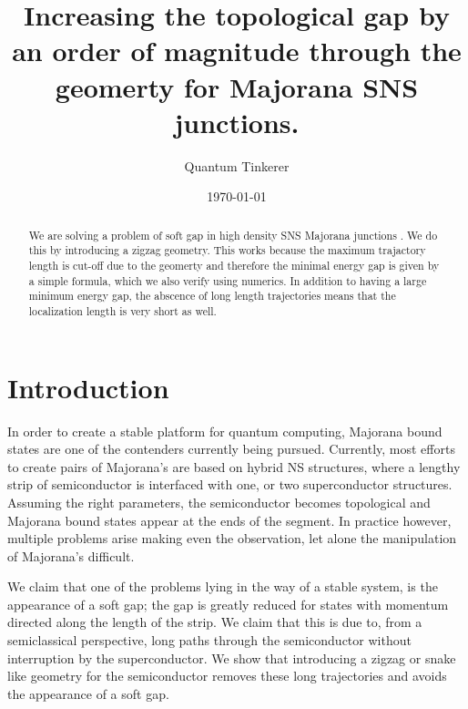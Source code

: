 \documentclass[english, twocolumn, 10pt, aps, superscriptaddress, floatfix, prb, citeautoscript]{revtex4-1}
\begin{document}
\title{Increasing the topological gap by an order of magnitude through the geomerty for Majorana SNS junctions.}

\author{Quantum Tinkerer}

\date{\today}

\begin{abstract}
We are solving a problem of soft gap in high density SNS Majorana junctions \cite{pientka2017topological}.
We do this by introducing a zigzag geometry.
This works because the maximum trajactory length is cut-off due to the geomerty and therefore the minimal energy gap is given by a simple formula, which we also verify using numerics.
In addition to having a large minimum energy gap, the abscence of long length trajectories means that the localization length is very short as well.
\end{abstract}

\maketitle

\section{Introduction}
In order to create a stable platform for quantum computing, Majorana bound states are one of the contenders currently being pursued. Currently, most efforts to create pairs of Majorana's are based on hybrid NS structures, where a lengthy strip of semiconductor is interfaced with one, or two superconductor structures. Assuming the right parameters, the semiconductor becomes topological and Majorana bound states appear at the ends of the segment. In practice however, multiple problems arise making even the observation, let alone the manipulation of Majorana's difficult.

We claim that one of the problems lying in the way of a stable system, is the appearance of a soft gap; the gap is greatly reduced for states with momentum directed along the length of the strip. We claim that this is due to, from a semiclassical perspective, long paths through the semiconductor without interruption by the superconductor. We show that introducing a zigzag or snake like geometry for the semiconductor removes these long trajectories and avoids the appearance of a soft gap.
\end{document}
